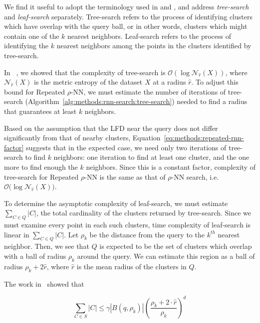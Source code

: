 We find it useful to adopt the terminology used in \cite{ishaq2019clustered} and \cite{yu2015entropy}, and address \textit{tree-search} and \textit{leaf-search} separately.
Tree-search refers to the process of identifying clusters which have overlap with the query ball, or in other words, clusters which might contain one of the $k$ nearest neighbors. 
Leaf-search refers to the process of identifying the $k$ nearest neighbors among the points in the clusters identified by tree-search.

In ~\cite{ishaq2019clustered}, we showed that the complexity of tree-search is $\mathcal{O}(\log\mathcal{N}_{\hat{r}}(X))$, where $\mathcal{N}_{\hat{r}}(X)$ is the metric entropy of the dataset $X$ at a radius $\hat{r}$.
To adjust this bound for Repeated $\rho$-NN, we must estimate the number of iterations of tree-search (Algorithm~\ref{alg:methods:rnn-search:tree-search}) needed to find a radius that guarantees at least $k$ neighbors.

Based on the assumption that the LFD near the query does not differ significantly from that of nearby clusters, Equation~\ref{eq:methods:repeated-rnn-factor} suggests that in the expected case, we need only two iterations of tree-search to find $k$ neighbors:
one iteration to find at least one cluster, and the one more to find enough the $k$ neighbors.
Since this is a constant factor, complexity of tree-search for Repeated $\rho$-NN is the same as that of $\rho$-NN search, i.e. $\mathcal{O}\big(\log\mathcal{N}_{\hat{r}}(X)\big)$.

To determine the asymptotic complexity of leaf-search, we must estimate $\sum_{C \in Q} |C|$, the total cardinality of the clusters returned by tree-search.
Since we must examine every point in each such clusters, time complexity of leaf-search is linear in $\sum_{C \in Q} |C|$. 
Let $\rho_k$ be the distance from the query to the $k^{th}$ nearest neighbor.
Then, we see that $Q$ is expected to be the set of clusters which overlap with a ball of radius $\rho_k$ around the query.
We can estimate this region as a ball of radius $\rho_k + 2\hat{r}$, where $\hat{r}$ is the mean radius of the clusters in $Q$.

The work in~\cite{yu2015entropy} showed that

\begin{equation*}
    \sum_{C \in S} |C| \leq \gamma  \left| B(q, \rho_k) \right| \left(\frac{\rho_k + 2 \cdot \hat{r}}{\rho_k} \right)^d
\end{equation*}


